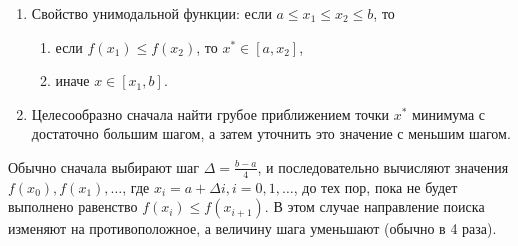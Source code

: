 \begin{enumerate}
	\item Свойство унимодальной функции:
	если $a \le x_1 \le x_2 \le b$, то

	\begin{enumerate}
		\item если $f(x_1) \le f(x_2)$, то $x^* \in [a, x_2]$,
		\item иначе $x \in [x_1, b]$.
	\end{enumerate}

	\item Целесообразно сначала найти грубое приближением точки $x^*$ минимума с достаточно большим шагом, а затем уточнить это значение с меньшим шагом.
\end{enumerate}

Обычно сначала выбирают шаг $\Delta = \frac{b - a}{4}$, и последовательно вычисляют значения $f(x_0), f(x_1), \dots$, где $x_i = a + \Delta i, i = 0, 1, \dots$, до тех пор, пока не будет выполнено равенство $f(x_i) \le f(x_{i+1})$. В этом случае направление поиска изменяют на противоположное, а величину шага уменьшают (обычно в 4 раза).


